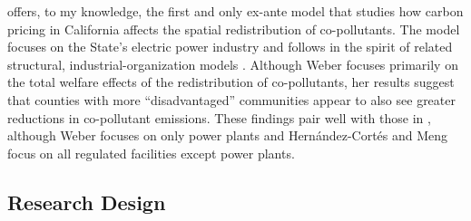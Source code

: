 \cite{weber2021dynamic} offers, to my knowledge, the first and only ex-ante model that studies how carbon pricing in California affects the spatial redistribution of co-pollutants. The model focuses on the State's electric power industry and follows in the spirit of related structural, industrial-organization models \citep[e.g.,~][]{gowrisankaran2022policy, abito2022role}. Although Weber focuses primarily on the total welfare effects of the redistribution of co-pollutants, her results suggest that counties with more ``disadvantaged” communities appear to also see greater reductions in co-pollutant emissions. These findings pair well with those in \cite{hernandez2023environmental}, although Weber focuses on only power plants and Hernández-Cortés and Meng focus on all regulated facilities except power plants.




\subsection{Research Design}






